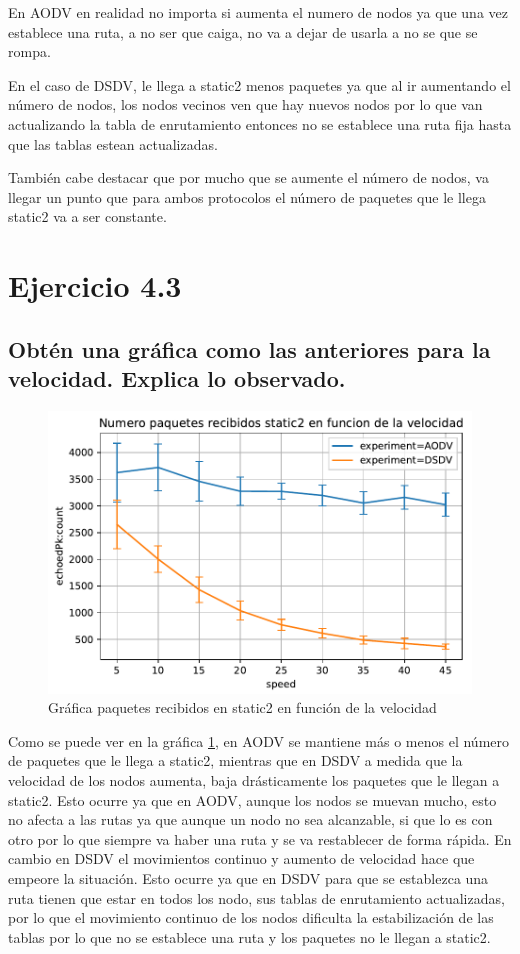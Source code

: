 En AODV en realidad no importa si aumenta el numero de nodos ya que una vez establece una ruta, a no ser que caiga, no va a dejar de usarla a no se que se rompa. 

En el caso de DSDV, le llega a static2 menos paquetes ya que al ir aumentando el número de nodos, los nodos vecinos ven que hay nuevos nodos por lo que van actualizando la tabla de enrutamiento entonces no se establece una ruta fija hasta que las tablas estean actualizadas.

También cabe destacar que por mucho que se aumente el número de nodos, va llegar un punto que para ambos protocolos el número de paquetes que le llega static2 va a ser constante.


\section{Ejercicio 4.3}

\subsection{Obtén una gráfica como las anteriores para la velocidad. Explica lo observado.}

\begin{figure}[H]
    \centering
    \includegraphics{imaxes/graficas/ejer4_3.pdf}
    \caption{Gráfica paquetes recibidos en static2 en función de la velocidad}
    \label{fig:ejer4_3}
\end{figure}

Como se puede ver en la gráfica \ref{fig:ejer4_3}, en AODV se mantiene más o menos el número de paquetes que le llega a static2, mientras que en DSDV a medida que la velocidad de los nodos aumenta, baja drásticamente los paquetes que le llegan a static2. Esto ocurre ya que en AODV, aunque los nodos se muevan mucho, esto no afecta a las rutas ya que aunque un nodo no sea alcanzable, si que lo es con otro por lo que siempre va haber una ruta y se va restablecer de forma rápida. En cambio en DSDV el movimientos continuo y aumento de velocidad hace que empeore la situación. Esto ocurre ya que en DSDV para que se establezca una ruta tienen que estar en todos los nodo, sus tablas de enrutamiento actualizadas, por lo que el movimiento continuo de los nodos dificulta la estabilización de las tablas por lo que no se establece una ruta y los paquetes no le llegan a static2. 

